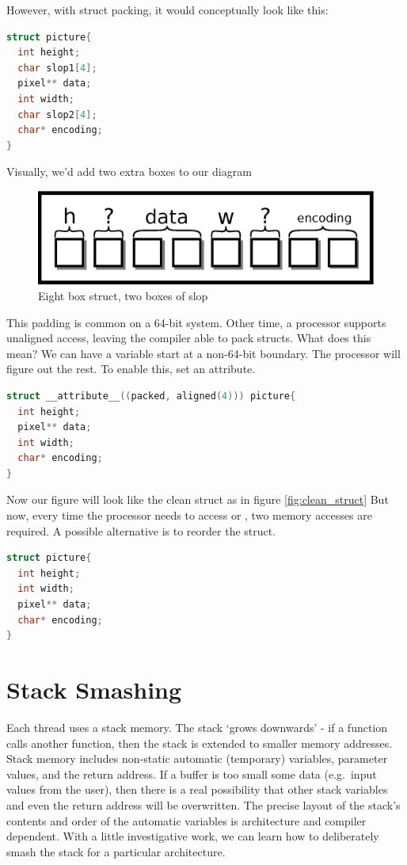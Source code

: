 However, with struct packing, it would conceptually look like this:

\begin{lstlisting}[language=C]
struct picture{
  int height;
  char slop1[4];
  pixel** data;
  int width;
  char slop2[4];
  char* encoding;
}
\end{lstlisting}

Visually, we'd add two extra boxes to our diagram

\begin{figure}[H]
\centering
\includegraphics[width=.7\textwidth]{appendix/drawings/struct_slop.eps}
\caption{Eight box struct, two boxes of slop}
\label{fig:sloppy_struct}
\end{figure}

This padding is common on a 64-bit system.
Other time, a processor supports unaligned access, leaving the compiler able to pack structs.
What does this mean?
We can have a variable start at a non-64-bit boundary.
The processor will figure out the rest.
To enable this, set an attribute.

\begin{lstlisting}[language=C]
struct __attribute__((packed, aligned(4))) picture{
  int height;
  pixel** data;
  int width;
  char* encoding;
}
\end{lstlisting}

Now our figure will look like the clean struct as in figure  \ref{fig:clean_struct}
But now, every time the processor needs to access  or ,
two memory accesses are required.
A possible alternative is to reorder the struct.

\begin{lstlisting}[language=C]
struct picture{
  int height;
  int width;
  pixel** data;
  char* encoding;
}
\end{lstlisting}

\section{Stack Smashing}

Each thread uses a stack memory.
The stack `grows downwards' - if a function calls another function, then the stack is extended to smaller memory addresses.
Stack memory includes non-static automatic (temporary) variables, parameter values, and the return address.
If a buffer is too small some data (e.g.~input values from the user), then there is a real possibility that other stack variables and even the return address will be overwritten.
The precise layout of the stack's contents and order of the automatic variables is architecture and compiler dependent. With a little investigative work, we can learn how to deliberately smash the stack for a particular architecture.

